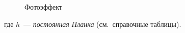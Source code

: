 \documentclass[main.tex]{subfiles}
\begin{document}
{%
\setlength\intextsep{0pt}
\begin{figure}
    \centering
    \caption{Фотоэффект}
    \label{fig:p197}
\end{figure}

\noindent где $h$~--- \emph{постоянная Планка} (см.~справочные таблицы).









}
\end{document}
